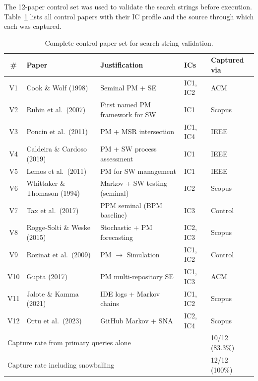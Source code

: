The 12-paper control set was used to validate the search strings before
execution. Table~\ref{tab:app-control} lists all control papers with their
IC profile and the source through which each was captured.

\begin{table}[htbp]
\centering
\caption{Complete control paper set for search string validation.}
\label{tab:app-control}
\small
\setlength{\tabcolsep}{3pt}
\begin{tabular}{c p{4.0cm} p{3.8cm} l l}
\toprule
\textbf{\#} & \textbf{Paper} & \textbf{Justification} & \textbf{ICs} &
  \textbf{Captured via} \\
\midrule
V1  & Cook \& Wolf (1998)~\cite{cook1998}              & Seminal PM + SE             & IC1, IC2 & ACM \\
V2  & Rubin et al.\ (2007)~\cite{rubin2007}            & First named PM framework for SW & IC1 & Scopus \\
V3  & Poncin et al.\ (2011)~\cite{poncin2011}          & PM + MSR intersection       & IC1, IC4 & IEEE \\
V4  & Caldeira \& Cardoso (2019)                        & PM + SW process assessment  & IC1      & IEEE \\
V5  & Lemos et al.\ (2011)                              & PM for SW management        & IC1      & IEEE \\
V6  & Whittaker \& Thomason (1994)~\cite{whittaker1994} & Markov + SW testing (seminal) & IC2    & Scopus \\
V7  & Tax et al.\ (2017)~\cite{tax2017}                & PPM seminal (BPM baseline)  & IC3      & Control \\
V8  & Rogge-Solti \& Weske (2015)                       & Stochastic + PM forecasting & IC2, IC3 & Scopus \\
V9  & Rozinat et al.\ (2009)                            & PM $\rightarrow$ Simulation  & IC1, IC2 & Control \\
V10 & Gupta (2017)~\cite{gupta2017}                    & PM multi-repository SE      & IC1, IC3 & ACM \\
V11 & Jalote \& Kamma (2021)~\cite{jalote2021}         & IDE logs + Markov chains    & IC1, IC2 & Scopus \\
V12 & Ortu et al.\ (2023)~\cite{ortu2023}              & GitHub Markov + SNA         & IC2, IC4 & Scopus \\
\midrule
\multicolumn{4}{l}{Capture rate from primary queries alone} & 10/12 (83.3\%) \\
\multicolumn{4}{l}{Capture rate including snowballing}      & 12/12 (100\%) \\
\bottomrule
\end{tabular}
\end{table}


